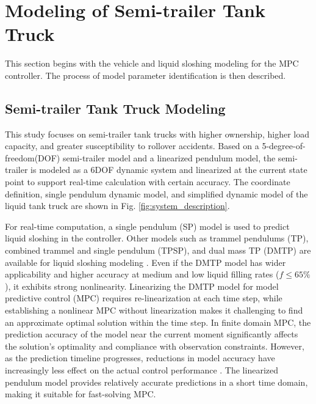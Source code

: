 \section{Modeling of Semi-trailer Tank Truck}
This section begins with the vehicle and liquid sloshing modeling for the MPC controller. The process of model parameter identification is then described. 

\vspace{-0.3cm}

\subsection{Semi-trailer Tank Truck Modeling}

This study focuses on semi-trailer tank trucks with higher ownership, higher load capacity, and greater susceptibility to rollover accidents. Based on a 5-degree-of-freedom(DOF) semi-trailer model \cite{ParamDisting1}\cite{ParamDisting2} and a linearized pendulum model, the semi-trailer is modeled as a 6DOF dynamic system and linearized at the current state point to support real-time calculation with certain accuracy. The coordinate definition, single pendulum dynamic model, and simplified dynamic model of the liquid tank truck are shown in Fig. \ref{fig:system_description}.

For real-time computation, a single pendulum (SP) model is used to predict liquid sloshing in the controller. Other models such as trammel pendulums (TP), combined trammel and single pendulum (TPSP), and dual mass TP (DMTP) are available for liquid sloshing modeling \cite{KomasaMutiDOF}. Even if the DMTP model has wider applicability and higher accuracy at medium and low liquid filling rates ($f\leq65\%$), it exhibits strong nonlinearity. Linearizing the DMTP model for model predictive control (MPC) requires re-linearization at each time step, while establishing a nonlinear MPC without linearization makes it challenging to find an approximate optimal solution within the time step. In finite domain MPC, the prediction accuracy of the model near the current moment significantly affects the solution's optimality and compliance with observation constraints. However, as the prediction timeline progresses, reductions in model accuracy have increasingly less effect on the actual control performance \cite{EbenLi_FastMPC}. The linearized pendulum model provides relatively accurate predictions in a short time domain, making it suitable for fast-solving MPC.

